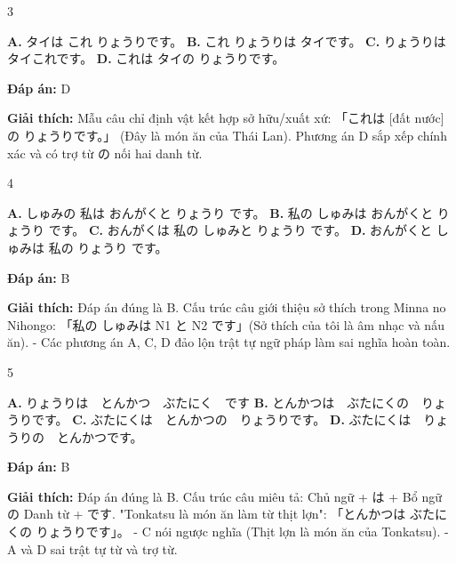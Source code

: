 \documentclass[12pt,a4paper]{report}
\newcommand{\source}[1]{}
\newcommand{\choice}[2]{\textbf{#1.} #2 \quad}
\newcommand{\answer}[1]{\par\textbf{Đáp án:} #1}
\newcommand{\confidence}[1]{}
\newcommand{\explain}[1]{\par\textbf{Giải thích:} #1\vspace{0.5cm}}
\begin{document}
\begin{question}{3}
\source{Q25_96_20251121082836.webp}
\choice{A}{タイは これ りょうりです。}
\choice{B}{これ りょうりは タイです。}
\choice{C}{りょうりは タイこれです。}
\choice{D}{これは タイの りょうりです。}
\answer{D}
\confidence{high}
\explain{Mẫu câu chỉ định vật kết hợp sở hữu/xuất xứ: 「これは [đất nước] の りょうりです。」 (Đây là món ăn của Thái Lan). Phương án D sắp xếp chính xác và có trợ từ の nối hai danh từ.}
\end{question}

\begin{question}{4}
\source{Q9.jpg}
\choice{A}{しゅみの 私は おんがくと りょうり です。}
\choice{B}{私の しゅみは おんがくと りょうり です。}
\choice{C}{おんがくは 私の しゅみと りょうり です。}
\choice{D}{おんがくと しゅみは 私の りょうり です。}
\answer{B}
\confidence{high}
\explain{Đáp án đúng là B. Cấu trúc câu giới thiệu sở thích trong Minna no Nihongo: 「私の しゅみは N1 と N2 です」(Sở thích của tôi là âm nhạc và nấu ăn).
- Các phương án A, C, D đảo lộn trật tự ngữ pháp làm sai nghĩa hoàn toàn.}
\end{question}

\begin{question}{5}
\source{Q14.jpg}
\choice{A}{りょうりは　とんかつ　ぶたにく　です}
\choice{B}{とんかつは　ぶたにくの　りょうりです。}
\choice{C}{ぶたにくは　とんかつの　りょうりです。}
\choice{D}{ぶたにくは　りょうりの　とんかつです。}
\answer{B}
\confidence{high}
\explain{Đáp án đúng là B. Cấu trúc câu miêu tả: Chủ ngữ + は + Bổ ngữ の Danh từ + です. "Tonkatsu là món ăn làm từ thịt lợn": 「とんかつは ぶたにくの りょうりです」。
- C nói ngược nghĩa (Thịt lợn là món ăn của Tonkatsu).
- A và D sai trật tự từ và trợ từ.}
\end{question}
\end{document}
